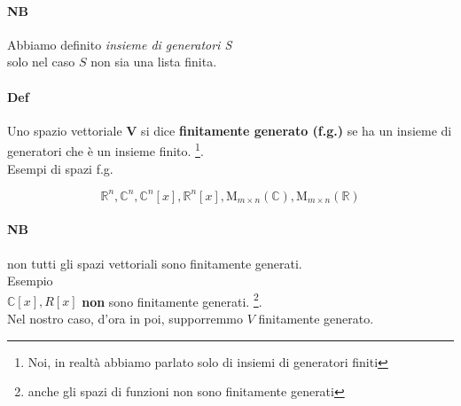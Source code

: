 \paragraph{NB} Abbiamo definito \textit{insieme di generatori S} \\
solo nel caso $S$ non sia una lista finita. \\
\paragraph{Def} Uno spazio vettoriale $\pmb{V}$ si dice \textbf{finitamente generato (f.g.)}
se ha un insieme di generatori che è un insieme finito. 
\footnote{Noi, in realtà abbiamo parlato solo di insiemi di generatori finiti}.\\
Esempi di spazi f.g. 

\[
    \mathbb{R}^n, \mathbb{C}^n, \mathbb{C}^n[x], \mathbb{R}^n[x], 
    \textrm{M}_{m\times n }(\mathbb{C}), \textrm{M}_{m\times n}(\mathbb{R})
\]

\paragraph{NB} non tutti gli spazi vettoriali sono finitamente generati.\\
Esempio\\
$\mathbb{C}[x], R[x]$ \textbf{non} sono finitamente generati. \footnote 
{anche gli spazi di funzioni non sono finitamente generati}.\\
Nel nostro caso, d'ora in poi, supporremmo $V$ finitamente generato. 

